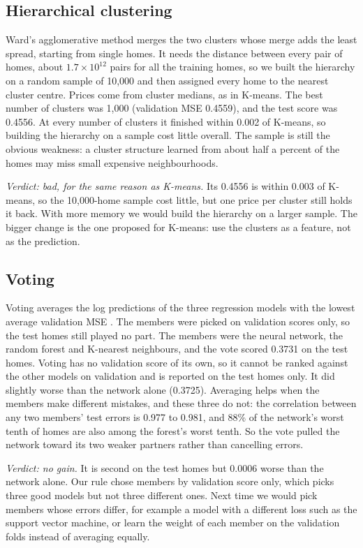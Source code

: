 \documentclass[sigconf,nonacm,10pt]{acmart}
\begin{document}
\subsection{Hierarchical clustering}
Ward's agglomerative method \cite{ward1963} merges the two clusters whose merge adds the least spread, starting from single homes. It needs the distance between every pair of homes, about $1.7 \times 10^{12}$ pairs for all the training homes, so we built the hierarchy on a random sample of 10,000 and then assigned every home to the nearest cluster centre. Prices come from cluster medians, as in K-means. The best number of clusters was 1,000 (validation MSE 0.4559), and the test score was 0.4556. At every number of clusters it finished within 0.002 of K-means, so building the hierarchy on a sample cost little overall. The sample is still the obvious weakness: a cluster structure learned from about half a percent of the homes may miss small expensive neighbourhoods.

\emph{Verdict: bad, for the same reason as K-means.} Its 0.4556 is within 0.003 of K-means, so the 10,000-home sample cost little, but one price per cluster still holds it back. With more memory we would build the hierarchy on a larger sample. The bigger change is the one proposed for K-means: use the clusters as a feature, not as the prediction.

\subsection{Voting}
Voting averages the log predictions of the three regression models with the lowest average validation MSE \cite{dietterich2000}. The members were picked on validation scores only, so the test homes still played no part. The members were the neural network, the random forest and K-nearest neighbours, and the vote scored 0.3731 on the test homes. Voting has no validation score of its own, so it cannot be ranked against the other models on validation and is reported on the test homes only. It did slightly worse than the network alone (0.3725). Averaging helps when the members make different mistakes, and these three do not: the correlation between any two members' test errors is 0.977 to 0.981, and 88\% of the network's worst tenth of homes are also among the forest's worst tenth. So the vote pulled the network toward its two weaker partners rather than cancelling errors.

\emph{Verdict: no gain.} It is second on the test homes but 0.0006 worse than the network alone. Our rule chose members by validation score only, which picks three good models but not three different ones. Next time we would pick members whose errors differ, for example a model with a different loss such as the support vector machine, or learn the weight of each member on the validation folds instead of averaging equally.
\end{document}
